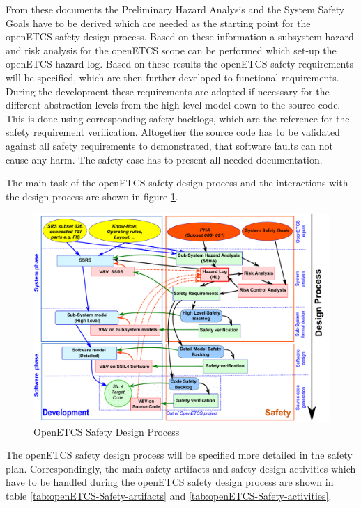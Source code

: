 \documentclass{template/openetcs_report}
\begin{document}
From these documents the Preliminary Hazard Analysis and the System Safety Goals have to be derived which are needed as the starting point for the openETCS safety design process. Based on these information a subsystem hazard and risk analysis for the openETCS scope can be performed which set-up the openETCS hazard log. Based on these results the openETCS safety requirements will be specified, which are then further developed to functional requirements. During the development these requirements are adopted if necessary for the different abstraction levels from the high level model down to the source code. This is done using corresponding safety backlogs, which are the reference for the safety requirement verification. Altogether the source code has to be validated against all safety requirements to demonstrated, that software faults can not cause any harm. The safety case has to present all needed documentation.
 
The main task of the openETCS safety design process and the interactions with the design process are shown in figure \ref{fig:WholeSafetyProcess}.

\begin{figure}[htbp]
\centering
\includegraphics[width=0.8\linewidth]{WholeSafetyProcess}
\caption{OpenETCS Safety Design Process}
\label{fig:WholeSafetyProcess}
\end{figure}

The openETCS safety design process will be specified more detailed in the safety plan. Correspondingly, the main safety artifacts and safety design activities which have to be handled during the openETCS safety design process are shown in table \ref{tab:openETCS-Safety-artifacts} and \ref{tab:openETCS-Safety-activities}.
\end{document}
